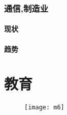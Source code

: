 \documentclass[utf8]{book}
\begin{document}
\section{通信,制造业}

\subsection{现状}

\subsection{趋势}



\part{教育}

	\begin{figure}[H]
	\centering
	\texttt{[image: m6]}
    \end{figure}
\end{document}
